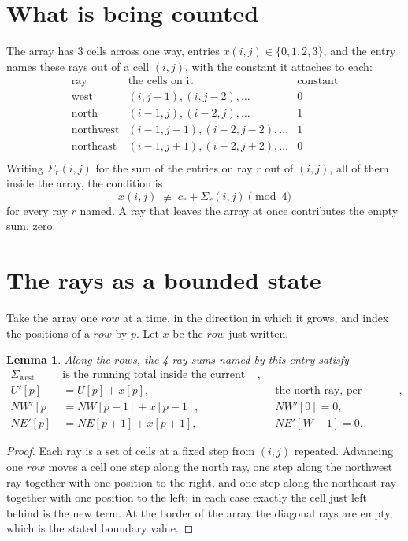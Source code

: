 \documentclass[11pt,a4paper]{article}
\theoremstyle{plain}
\newtheorem{lemma}[theorem]{Lemma}
\theoremstyle{definition}
\begin{document}
\section{What is being counted}

The array has $3$ cells across one way, entries $x(i,j)\in\{0,1,2,3\}$, and the entry names these
rays out of a cell $(i,j)$, with the constant it attaches to each:
\[
\begin{array}{lll}
\text{ray} & \text{the cells on it} & \text{constant} \\[2pt]
\text{west} & (i,j-1),(i,j-2),\dots & 0 \\
\text{north} & (i-1,j),(i-2,j),\dots & 1 \\
\text{northwest} & (i-1,j-1),(i-2,j-2),\dots & 1 \\
\text{northeast} & (i-1,j+1),(i-2,j+2),\dots & 0 \\
\end{array}
\]
Writing $\Sigma_r(i,j)$ for the sum of the entries on ray $r$ out of $(i,j)$, all of them
inside the array, the condition is
\[
x(i,j)\;\not\equiv\;c_r+\Sigma_r(i,j) \pmod{4}
\]
for every ray $r$ named. A ray that leaves the array at once contributes the empty sum,
zero.

\section{The rays as a bounded state}

Take the array one $row$ at a time, in the direction in which it grows, and index the
positions of a $row $ by $p$. Let $x$ be the $row$ just written.

\begin{lemma}\label{lem:rays}
Along the $row$s, the 4 ray sums named by this entry satisfy
\[
\begin{aligned}
\Sigma_{\mathrm{west}}\ &\text{is the running total inside the current row},\\
U'[p]&=U[p]+x[p], &&\text{the north ray, per position},\\
NW'[p]&=NW[p-1]+x[p-1], && NW'[0]=0,\\
NE'[p]&=NE[p+1]+x[p+1], && NE'[W-1]=0 .
\end{aligned}
\]
\end{lemma}

\begin{proof}
Each ray is a set of cells at a fixed step from $(i,j)$ repeated. Advancing one $row$
moves a cell one step along the north ray, one step along the northwest ray together with one
position to the right, and one step along the northeast ray together with one position to the
left; in each case exactly the cell just left behind is the new term. At the border of the
array the diagonal rays are empty, which is the stated boundary value.
\end{proof}
\end{document}
